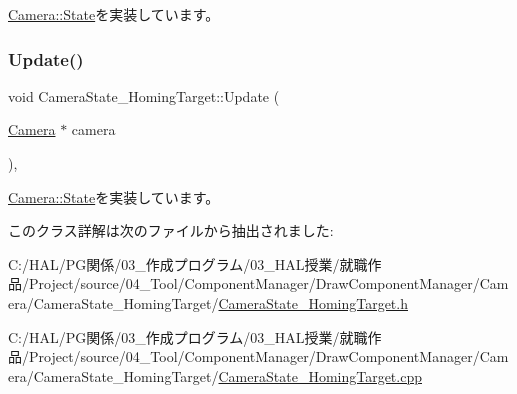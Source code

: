 \mbox{\hyperlink{class_camera_1_1_state_a68ebfc3f15cae24b342cb5dae57497cf}{Camera\+::\+State}}を実装しています。

\mbox{\label{class_camera_state___homing_target_a98f04985c06033febdad32d6357088c9}} 
\subsubsection{\texorpdfstring{Update()}{Update()}}
{\footnotesize\ttfamily void Camera\+State\+\_\+\+Homing\+Target\+::\+Update (\begin{DoxyParamCaption}\item[{\mbox{\hyperlink{class_camera}{Camera}} $\ast$}]{camera }\end{DoxyParamCaption})\hspace{0.3cm}{\ttfamily [override]}, {\ttfamily [virtual]}}



\mbox{\hyperlink{class_camera_1_1_state_a2d41e0cb783666bae6c6ea167fcc7874}{Camera\+::\+State}}を実装しています。



このクラス詳解は次のファイルから抽出されました\+:\begin{DoxyCompactItemize}
\item 
C\+:/\+H\+A\+L/\+P\+G関係/03\+\_\+作成プログラム/03\+\_\+\+H\+A\+L授業/就職作品/\+Project/source/04\+\_\+\+Tool/\+Component\+Manager/\+Draw\+Component\+Manager/\+Camera/\+Camera\+State\+\_\+\+Homing\+Target/\mbox{\hyperlink{_camera_state___homing_target_8h}{Camera\+State\+\_\+\+Homing\+Target.\+h}}\item 
C\+:/\+H\+A\+L/\+P\+G関係/03\+\_\+作成プログラム/03\+\_\+\+H\+A\+L授業/就職作品/\+Project/source/04\+\_\+\+Tool/\+Component\+Manager/\+Draw\+Component\+Manager/\+Camera/\+Camera\+State\+\_\+\+Homing\+Target/\mbox{\hyperlink{_camera_state___homing_target_8cpp}{Camera\+State\+\_\+\+Homing\+Target.\+cpp}}\end{DoxyCompactItemize}
